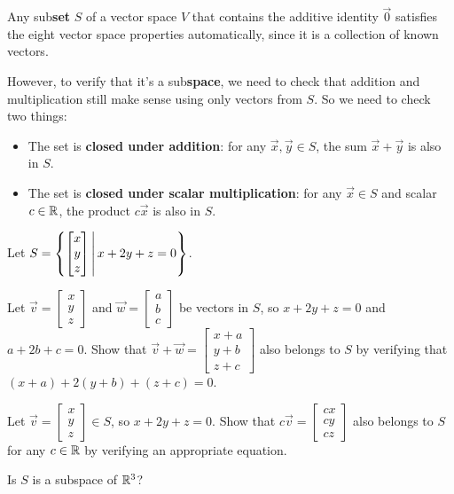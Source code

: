 \begin{fact}
  Any sub\textbf{set} \(S\) of a vector space \(V\) that contains
  the additive identity \(\vec 0\) satisfies the eight
  vector space properties automatically, since it is a collection of known
  vectors.

  \vspace{1em}

  However, to verify that it's a sub\textbf{space}, we need to check that
  addition and multiplication still make sense using only vectors from \(S\).
  So we need to check two things:

  \begin{itemize}
  \item The set is \textbf{closed under addition}: for any \(\vec{x},\vec{y} \in S\), the sum \(\vec{x}+\vec{y}\) is also in \(S\).
  \item The set is \textbf{closed under scalar multiplication}: for any \(\vec{x} \in S\) and scalar \(c \in \mathbb{R}\), the product \(c\vec{x}\) is also in \(S\).
\end{itemize}
\end{fact}

\begin{activity}{15}
Let \(S=\left\{\begin{bmatrix} x \\ y \\ z \end{bmatrix}\,\middle|\, x+2y+z=0\right\}\).

\begin{subactivity}
  Let \(\vec{v}=\begin{bmatrix} x \\ y \\ z \end{bmatrix}\) and
  \(\vec{w} = \begin{bmatrix} a \\ b \\ c \end{bmatrix} \) be vectors in \(S\),
  so \(x+2y+z=0\) and \(a+2b+c=0\). Show that
  \(\vec v+\vec w = \begin{bmatrix} x+a \\ y+b \\ z+c \end{bmatrix}\)
  also belongs to \(S\) by verifying that \((x+a)+2(y+b)+(z+c)=0\).
\end{subactivity}
\begin{subactivity}
  Let \(\vec{v}=\begin{bmatrix} x \\ y \\ z \end{bmatrix}\in S\), so
  \(x+2y+z=0\). Show that \(c\vec v=\begin{bmatrix}cx\\cy\\cz\end{bmatrix}\) 
  also belongs to \(S\) for any \(c\in\mathbb{R}\) by verifying
  an appropriate equation.
\end{subactivity}
\begin{subactivity}
  Is \(S\) is a subspace of \(\mathbb{R}^3\)?
\end{subactivity}
\end{activity}

